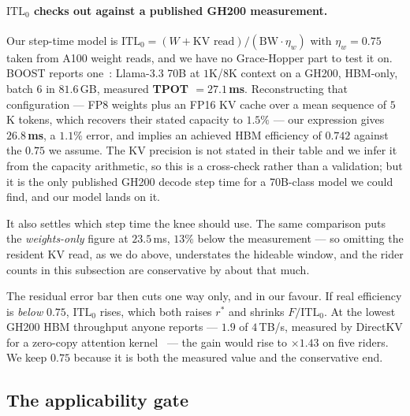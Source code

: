 \paragraph{$\mathrm{ITL}_0$ checks out against a published GH200 measurement.}
Our step-time model is $\mathrm{ITL}_0 = (W + \text{KV read})/(\mathrm{BW} \cdot
\eta_w)$ with $\eta_w = 0.75$ taken from A100 weight reads, and we have no
Grace-Hopper part to test it on. BOOST reports one~\cite{boost}: Llama-3.3 70B at
$1$K/$8$K context on a GH200, HBM-only, batch $6$ in $81.6$\,GB, measured
\textbf{TPOT $= 27.1$\,ms}. Reconstructing that configuration --- FP8 weights plus
an FP16 KV cache over a mean sequence of $5$K tokens, which recovers their stated
capacity to $1.5\%$ --- our expression gives $\mathbf{26.8}$\,\textbf{ms}, a
$1.1\%$ error, and implies an achieved HBM efficiency of $0.742$ against the
$0.75$ we assume. The KV precision is not stated in their table and we infer it
from the capacity arithmetic, so this is a cross-check rather than a validation;
but it is the only published GH200 decode step time for a 70B-class model we could
find, and our model lands on it.

It also settles which step time the knee should use. The same comparison puts the
\emph{weights-only} figure at $23.5$\,ms, $13\%$ below the measurement --- so
omitting the resident KV read, as we do above, understates the hideable window, and
the rider counts in this subsection are conservative by about that much.

The residual error bar then cuts one way only, and in our favour. If real
efficiency is \emph{below} $0.75$, $\mathrm{ITL}_0$ rises, which both raises $r^{*}$
and shrinks $F/\mathrm{ITL}_0$. At the lowest GH200 HBM throughput anyone reports
--- $1.9$ of $4$\,TB/s, measured by DirectKV for a zero-copy attention
kernel~\cite{directkv} --- the gain would rise to $\times 1.43$ on five riders. We
keep $0.75$ because it is both the measured value and the conservative end.

\subsection{The applicability gate}
\label{sec:model:gate}

